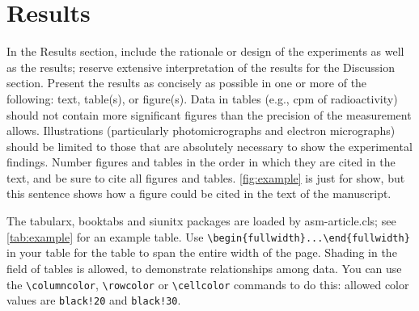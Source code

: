 \documentclass[lineno]{asm-article}
\begin{document}
\section{Results}

In the Results section, include the rationale or design of the experiments as well as the results; reserve extensive interpretation  of  the  results  for  the  Discussion  section.  Present the results as concisely as possible in one or more of the following: text, table(s), or figure(s). Data in tables (e.g., cpm of radioactivity) should not contain more significant figures than the precision of the measurement allows. Illustrations (particularly photomicrographs and electron micrographs) should be limited to those that are absolutely necessary to show the experimental findings. Number figures and tables in the order in which they are cited in the text, and be sure to cite all figures and tables. \autoref{fig:example} is just for show, but this sentence shows how a figure could be cited in the text of the manuscript.

The tabularx, booktabs and siunitx packages are loaded by asm-article.cls; see \autoref{tab:example} for an example table. Use \verb|\begin{fullwidth}...\end{fullwidth}| in your table for the table to span the entire width of the page. Shading in the field of tables is allowed, to demonstrate relationships among data. You can use the \verb|\columncolor|, \verb|\rowcolor| or \verb|\cellcolor| commands to do this: allowed color values are \verb|black!20| and \verb|black!30|.
\end{document}
